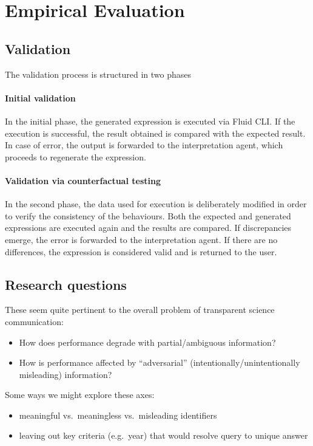 \section{Empirical Evaluation}
\label{sec:evaluation}

\subsection{Validation}
\label{subsec:validation-with-counterfactual-data}

The validation process is structured in two phases

\paragraph{Initial validation}
In the initial phase, the generated expression is executed via Fluid CLI.
If the execution is successful, the result obtained is compared with the expected result.
In case of error, the output is forwarded to the interpretation agent, which proceeds to regenerate the expression.

\paragraph{Validation via counterfactual testing}
In the second phase, the data used for execution is deliberately modified in order to verify the consistency of the behaviours.
Both the expected and generated expressions are executed again and the results are compared.
If discrepancies emerge, the error is forwarded to the interpretation agent.
If there are no differences, the expression is considered valid and is returned to the user.

\subsection{Research questions}

These seem quite pertinent to the overall problem of transparent science communication:
\begin{itemize}
\item How does performance degrade with partial/ambiguous information?
\item How is performance affected by ``adversarial'' (intentionally/unintentionally misleading) information?
\end{itemize}

Some ways we might explore these axes:
\begin{itemize}
\item meaningful vs.~meaningless vs.~misleading identifiers
\item leaving out key criteria (e.g.~year) that would resolve query to unique answer
\end{itemize}

